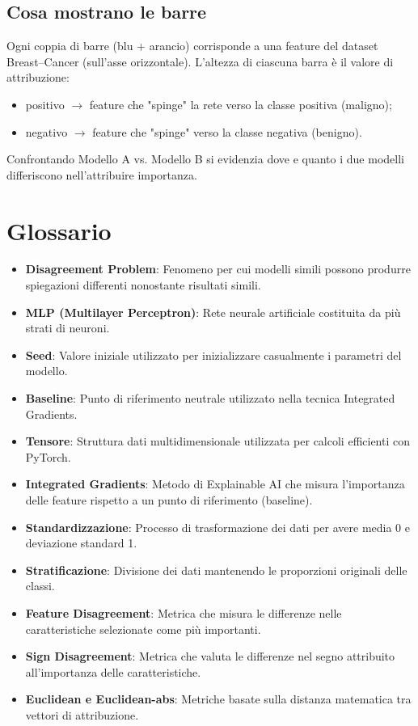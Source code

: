 \documentclass[a4paper,11pt]{article}
\begin{document}
\subsection*{Cosa mostrano le barre}
Ogni coppia di barre (blu + arancio) corrisponde a una feature del dataset Breast–Cancer (sull’asse orizzontale). 
L’altezza di ciascuna barra è il valore di attribuzione:
\begin{itemize}
  \item positivo $\to$ feature che "spinge" la rete verso la classe positiva (maligno);
  \item negativo $\to$ feature che "spinge" verso la classe negativa (benigno).
\end{itemize}
Confrontando Modello A vs. Modello B si evidenzia dove e quanto i due modelli differiscono nell'attribuire importanza.

\section{Glossario}
\begin{itemize}
\item \textbf{Disagreement Problem}: Fenomeno per cui modelli simili possono produrre spiegazioni differenti nonostante risultati simili.
\item \textbf{MLP (Multilayer Perceptron)}: Rete neurale artificiale costituita da più strati di neuroni.
\item \textbf{Seed}: Valore iniziale utilizzato per inizializzare casualmente i parametri del modello.
\item \textbf{Baseline}: Punto di riferimento neutrale utilizzato nella tecnica Integrated Gradients.
\item \textbf{Tensore}: Struttura dati multidimensionale utilizzata per calcoli efficienti con PyTorch.
\item \textbf{Integrated Gradients}: Metodo di Explainable AI che misura l'importanza delle feature rispetto a un punto di riferimento (baseline).
\item \textbf{Standardizzazione}: Processo di trasformazione dei dati per avere media 0 e deviazione standard 1.
\item \textbf{Stratificazione}: Divisione dei dati mantenendo le proporzioni originali delle classi.
\item \textbf{Feature Disagreement}: Metrica che misura le differenze nelle caratteristiche selezionate come più importanti.
\item \textbf{Sign Disagreement}: Metrica che valuta le differenze nel segno attribuito all'importanza delle caratteristiche.
\item \textbf{Euclidean e Euclidean-abs}: Metriche basate sulla distanza matematica tra vettori di attribuzione.
\end{itemize}
\end{document}
